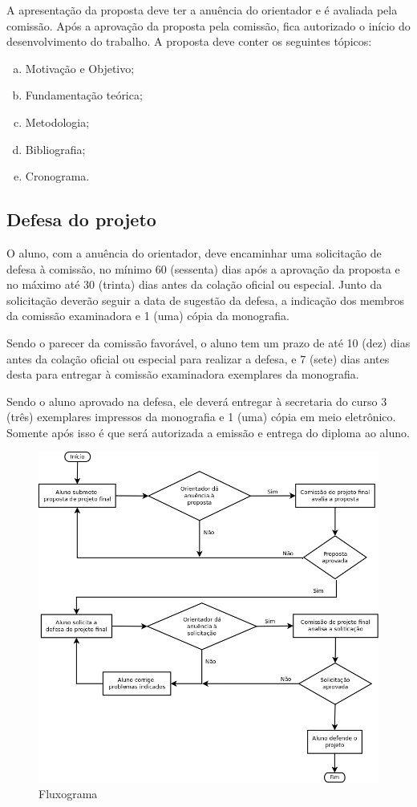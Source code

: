 A apresentação da proposta deve ter a anuência do orientador e é avaliada pela comissão. Após a 
aprovação da proposta pela comissão, fica autorizado o início do desenvolvimento do trabalho.
A proposta deve conter os seguintes tópicos:

\begin{enumerate}[a.]
\item Motivação e Objetivo;
\item Fundamentação teórica;
\item Metodologia;
\item Bibliografia;
\item Cronograma.
\end{enumerate}

\subsection{Defesa do projeto}
O aluno, com a anuência do orientador, deve encaminhar uma solicitação de defesa
à comissão, no mínimo 60 (sessenta) dias após a aprovação da proposta e no máximo 
até 30 (trinta) dias antes da colação oficial ou especial.
Junto da solicitação deverão seguir a data de sugestão da defesa, a indicação
dos membros da comissão examinadora e 1 (uma) cópia da monografia.

Sendo o parecer da comissão favorável, o aluno tem um prazo de até 10 (dez)
dias antes da colação oficial ou especial para realizar a defesa, e 7 (sete) dias
antes desta para entregar à comissão examinadora exemplares da monografia.

Sendo o aluno aprovado na defesa, ele deverá entregar à secretaria do curso 3 (três)
exemplares impressos da monografia e 1 (uma) cópia em meio eletrônico. Somente após 
isso é que será autorizada a emissão e entrega do diploma ao aluno.

\begin{figure}[htbp]
\centering
\includegraphics[width=1\textwidth]{fig/fluxograma_tcc.png}
\caption{Fluxograma}
\label{fig:graph}
\end{figure}


